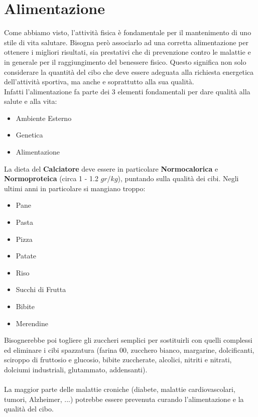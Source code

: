 \documentclass[../uefaC.tex]{subfiles}
\begin{document}
\section{Alimentazione}
Come abbiamo visto, l'attività fisica è fondamentale per il mantenimento di uno stile di vita salutare. Bisogna però associarlo ad una corretta alimentazione per ottenere i migliori risultati, sia prestativi che di prevenzione contro le malattie e in generale per il raggiungimento del benessere fisico. Questo significa non solo considerare la quantità del cibo che deve essere adeguata alla richiesta energetica dell'attività sportiva, ma anche e soprattutto alla sua qualità. \hfill \\
Infatti l'alimentazione fa parte dei 3 elementi fondamentali per dare qualità alla salute e alla vita:
\begin{itemize}
    \item Ambiente Esterno
    \item Genetica
    \item Alimentazione
\end{itemize}
La dieta del \textbf{Calciatore} deve essere in particolare \textbf{Normocalorica} e \textbf{Normoproteica} (circa 1 - 1.2 $gr / kg$), puntando sulla qualità dei cibi. Negli ultimi anni in particolare si mangiano troppo:
\begin{itemize}
    \item Pane
    \item Pasta
    \item Pizza
    \item Patate
    \item Riso
    \item Succhi di Frutta
    \item Bibite
    \item Merendine
\end{itemize}
Bisognerebbe poi togliere gli zuccheri semplici per sostituirli con quelli complessi ed eliminare i cibi spazzatura (farina 00, zucchero bianco, margarine, dolcificanti, sciroppo di fruttosio e glucosio, bibite zuccherate, alcolici, nitriti e nitrati, dolciumi industriali, glutammato, addensanti). \hfill \\
\hfill \\ 
La maggior parte delle malattie croniche (diabete, malattie cardiovascolari, tumori, Alzheimer, ...) potrebbe essere prevenuta curando l'alimentazione e la qualità del cibo.
\end{document}
